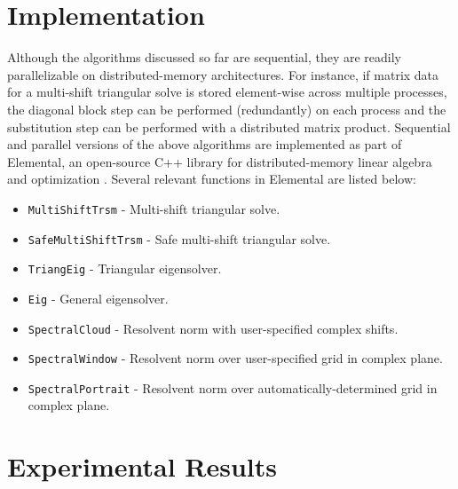 \documentclass{article}
\begin{document}
\section{Implementation}
Although the algorithms discussed so far are sequential, they are
readily parallelizable on distributed-memory architectures. For
instance, if matrix data for a multi-shift triangular solve is stored
element-wise across multiple processes, the diagonal block step can be
performed (redundantly) on each process and the substitution step can
be performed with a distributed matrix product.  Sequential and
parallel versions of the above algorithms are implemented as part of
Elemental, an open-source C++ library for distributed-memory linear
algebra and optimization \cite{poulson2013elemental}. Several relevant
functions in Elemental are listed below:
\begin{itemize}
\item \texttt{MultiShiftTrsm} - Multi-shift triangular solve.
\item \texttt{SafeMultiShiftTrsm} - Safe multi-shift triangular solve.
\item \texttt{TriangEig} - Triangular eigensolver.
\item \texttt{Eig} - General eigensolver.
\item \texttt{SpectralCloud} - Resolvent norm with user-specified complex shifts.
\item \texttt{SpectralWindow} - Resolvent norm over user-specified grid in complex plane.
\item \texttt{SpectralPortrait} - Resolvent norm over automatically-determined grid in complex plane.
\end{itemize}

\section{Experimental Results}
\end{document}
